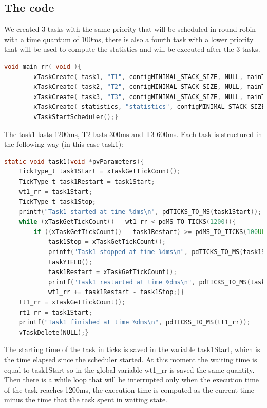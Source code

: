 \documentclass[9pt, reqno]{amsart}
\theoremstyle{definition}
\theoremstyle{remark}
\numberwithin{equation}{section}
\begin{document}
{\subsection{The code}
\label{sec:code Round Robin}
We created 3 tasks with the same priority that will be scheduled in round robin with a time quantum of 100ms, there is also a fourth task with a lower priority that will be used to compute the statistics and will be executed after the 3 tasks.
\begin{lstlisting}[breaklines=true, basicstyle=\bfseries,language=c,basicstyle=\small]
void main_rr( void ){
        xTaskCreate( task1, "T1", configMINIMAL_STACK_SIZE, NULL, mainTASK_PRIORITY, NULL );
        xTaskCreate( task2, "T2", configMINIMAL_STACK_SIZE, NULL, mainTASK_PRIORITY, NULL );
        xTaskCreate( task3, "T3", configMINIMAL_STACK_SIZE, NULL, mainTASK_PRIORITY, NULL );
        xTaskCreate( statistics, "statistics", configMINIMAL_STACK_SIZE, NULL, mainTASK_PRIORITY-1, NULL );  
        vTaskStartScheduler();}
\end{lstlisting} 
The task1 lasts 1200ms, T2 lasts 300ms and T3 600ms.
Each task is structured in the following way (in this case task1):
\begin{lstlisting}[breaklines=true, basicstyle=\bfseries,language=c,basicstyle=\small]
static void task1(void *pvParameters){
    TickType_t task1Start = xTaskGetTickCount();   
    TickType_t task1Restart = task1Start;           
    wt1_rr = task1Start;                            
    TickType_t task1Stop;
    printf("Task1 started at time %dms\n", pdTICKS_TO_MS(task1Start));
    while (xTaskGetTickCount() - wt1_rr < pdMS_TO_TICKS(1200)){                 
        if ((xTaskGetTickCount() - task1Restart) >= pdMS_TO_TICKS(100UL) && xTaskGetTickCount() - wt1_rr < pdMS_TO_TICKS(1200)){
            task1Stop = xTaskGetTickCount();                                    
            printf("Task1 stopped at time %dms\n", pdTICKS_TO_MS(task1Stop));
            taskYIELD();                                                        
            task1Restart = xTaskGetTickCount();                                 
            printf("Task1 restarted at time %dms\n", pdTICKS_TO_MS(task1Restart));
            wt1_rr += task1Restart - task1Stop;}}
    tt1_rr = xTaskGetTickCount();
    rt1_rr = task1Start;
    printf("Task1 finished at time %dms\n", pdTICKS_TO_MS(tt1_rr));
    vTaskDelete(NULL);}
\end{lstlisting}
The starting time of the task in ticks is saved in the variable task1Start, which is the time elapsed since the scheduler started. At this moment the waiting time is equal to task1Start so in the global variable wt1\_rr is saved the same quantity. Then there is a while loop that will be interrupted only when the execution time of the task reaches 1200ms, the execution time is computed as the current time minus the time that the task spent in waiting state.
}
\end{document}
